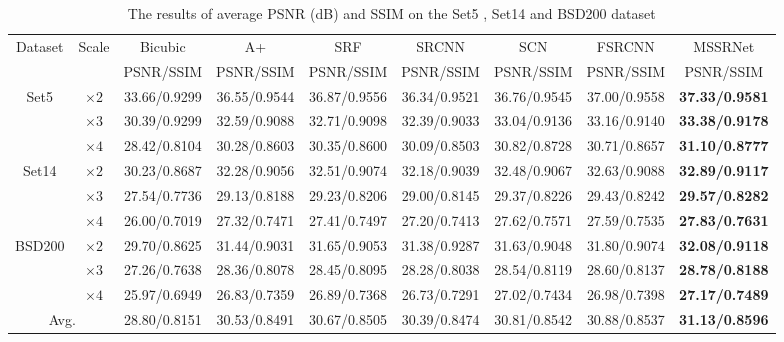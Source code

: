 \documentclass{article}
\begin{document}
\begin{table}[]
\small
\centering
\caption{The results of average PSNR (dB) and SSIM on the Set5 \cite{ref18}, Set14 \cite{ref19} and BSD200 \cite{ref20} dataset}
\label{tab:quantitative}
\begin{tabular}{|c|c|c|c|c|c|c|c|c|}
\hline
\multirow{2}{*}{Dataset} & \multirow{2}{*}{Scale} & Bicubic      & A+           & SRF          & SRCNN        & SCN          & FSRCNN       & MSSRNet               \\ \cline{3-9} 
                         &                        & PSNR/SSIM    & PSNR/SSIM    & PSNR/SSIM    & PSNR/SSIM    & PSNR/SSIM    & PSNR/SSIM    & PSNR/SSIM             \\ \hline
\multirow{3}{*}{Set5}    & $ \times 2$                      & 33.66/0.9299 & 36.55/0.9544 & 36.87/0.9556 & 36.34/0.9521 & 36.76/0.9545 & 37.00/0.9558 & \textbf{37.33/0.9581} \\ \cline{2-9} 
                         & $ \times 3$                     & 30.39/0.9299 & 32.59/0.9088 & 32.71/0.9098 & 32.39/0.9033 & 33.04/0.9136 & 33.16/0.9140 & \textbf{33.38/0.9178} \\ \cline{2-9} 
                         & $ \times 4$                      & 28.42/0.8104 & 30.28/0.8603 & 30.35/0.8600 & 30.09/0.8503 & 30.82/0.8728 & 30.71/0.8657 & \textbf{31.10/0.8777} \\ \hline
\multirow{3}{*}{Set14}   & $ \times 2$                      & 30.23/0.8687 & 32.28/0.9056 & 32.51/0.9074 & 32.18/0.9039 & 32.48/0.9067 & 32.63/0.9088 & \textbf{32.89/0.9117} \\ \cline{2-9} 
                         & $ \times 3$                      & 27.54/0.7736 & 29.13/0.8188 & 29.23/0.8206 & 29.00/0.8145 & 29.37/0.8226 & 29.43/0.8242 & \textbf{29.57/0.8282} \\ \cline{2-9} 
                         & $ \times 4$                      & 26.00/0.7019 & 27.32/0.7471 & 27.41/0.7497 & 27.20/0.7413 & 27.62/0.7571 & 27.59/0.7535 & \textbf{27.83/0.7631} \\ \hline
\multirow{3}{*}{BSD200}  & $ \times 2$                      & 29.70/0.8625 & 31.44/0.9031 & 31.65/0.9053 & 31.38/0.9287 & 31.63/0.9048 & 31.80/0.9074 & \textbf{32.08/0.9118} \\ \cline{2-9} 
                         & $ \times 3$                      & 27.26/0.7638 & 28.36/0.8078 & 28.45/0.8095 & 28.28/0.8038 & 28.54/0.8119 & 28.60/0.8137 & \textbf{28.78/0.8188} \\ \cline{2-9} 
                         & $ \times 4$                      & 25.97/0.6949 & 26.83/0.7359 & 26.89/0.7368 & 26.73/0.7291 & 27.02/0.7434 & 26.98/0.7398 & \textbf{27.17/0.7489} \\ \hline
\multicolumn{2}{|c|}{Avg.}                        & 28.80/0.8151 & 30.53/0.8491 & 30.67/0.8505 & 30.39/0.8474 & 30.81/0.8542 & 30.88/0.8537 & \textbf{31.13/0.8596} \\ \hline
\end{tabular}
\vspace{-0.5cm}
\end{table}
\end{document}
